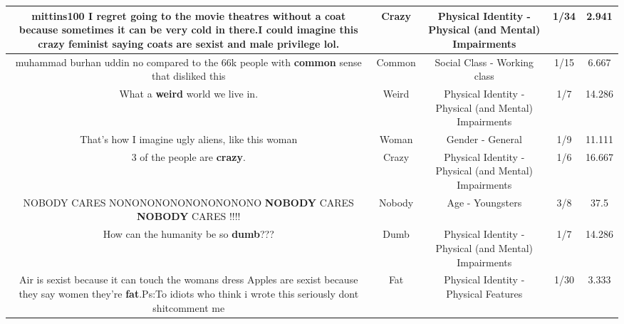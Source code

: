 \documentclass[11pt]{article}
\newlength\mylength
\begin{document}
\begin{center}
\begin{longtable}{|C{.65\mylength}|C{.30\mylength}|C{.12\mylength}|C{.12\mylength}|C{.12\mylength}|}
  \small mittins100 I regret going to the movie theatres without a coat because sometimes it can be very cold in there.I could imagine this \textbf{crazy} feminist saying coats are sexist and male privilege lol.\normalsize   & Crazy & Physical Identity - Physical (and Mental) Impairments & 1/34 & 2.941 \\  \hline
  \small muhammad burhan uddin no compared to the 66k people with \textbf{common} sense that disliked this\normalsize   & Common & Social Class - Working class & 1/15 & 6.667 \\  \hline
  \small What a \textbf{weird} world we live in.\normalsize   & Weird & Physical Identity - Physical (and Mental) Impairments & 1/7 & 14.286 \\  \hline
  \small That's how I imagine ugly aliens, like this woman\normalsize   & Woman & Gender - General & 1/9 & 11.111 \\  \hline
  \small 3 of the people are \textbf{crazy}.\normalsize   & Crazy & Physical Identity - Physical (and Mental) Impairments & 1/6 & 16.667 \\  \hline
  \small NOBODY CARES NONONONONONONONONONO \textbf{NOBODY} CARES \textbf{NOBODY} CARES !!!!\normalsize   & Nobody & Age - Youngsters & 3/8 & 37.5 \\  \hline
  \small How can the humanity be so \textbf{dumb}???\normalsize   & Dumb & Physical Identity - Physical (and Mental) Impairments & 1/7 & 14.286 \\  \hline
  \small Air is sexist because it can touch the womans dress Apples are sexist because they say women they're \textbf{fat}.Ps:To idiots who think i wrote this seriously dont shitcomment me\normalsize   & Fat & Physical Identity - Physical Features & 1/30 & 3.333 \\  \hline

\end{longtable}
\end{center}
\end{document}
